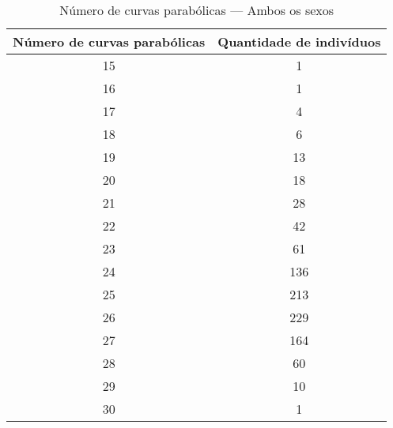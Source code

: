 \documentclass[a4paper,12pt]{article}
\begin{document}
\begin{table}[h!]
\centering
\caption{Número de curvas parabólicas — Ambos os sexos}
\begin{tabular}{c c}
\hline
\textbf{Número de curvas parabólicas} & \textbf{Quantidade de indivíduos} \\ 
\hline
15 & 1   \\
16 & 1   \\
17 & 4   \\
18 & 6   \\
19 & 13  \\
20 & 18  \\
21 & 28  \\
22 & 42  \\
23 & 61  \\
24 & 136 \\
25 & 213 \\
26 & 229 \\
27 & 164 \\
28 & 60  \\
29 & 10  \\
30 & 1   \\
\hline
\end{tabular}
\end{table}
\end{document}
